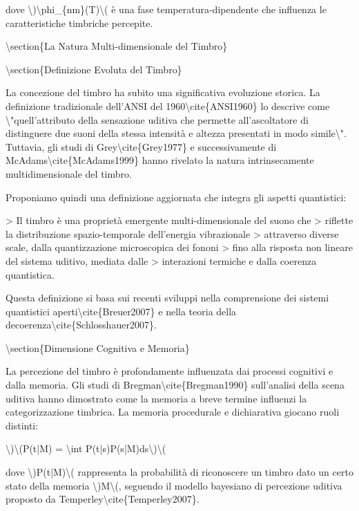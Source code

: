 \documentclass[a4paper,11pt]{article}
\begin{document}
dove \textbackslash{})\textbackslash{}phi\_\{nm\}(T)\textbackslash{}( \`e una fase temperatura-dipendente che influenza le
caratteristiche timbriche percepite.

\textbackslash{}section\{La Natura Multi-dimensionale del Timbro\}

\textbackslash{}section\{Definizione Evoluta del Timbro\}

La concezione del timbro ha subito una significativa evoluzione storica.
La definizione tradizionale dell'ANSI del 1960\textbackslash{}cite\{ANSI1960\} lo descrive
come \textbackslash{}"quell'attributo della sensazione uditiva che permette
all'ascoltatore di distinguere due suoni della stessa intensit\`a e
altezza presentati in modo simile\textbackslash{}". Tuttavia, gli studi di
Grey\textbackslash{}cite\{Grey1977\} e successivamente di McAdams\textbackslash{}cite\{McAdams1999\} hanno
rivelato la natura intrinsecamente multidimensionale del timbro.

Proponiamo quindi una definizione aggiornata che integra gli aspetti
quantistici:

> Il timbro \`e una propriet\`a emergente multi-dimensionale del suono che
> riflette la distribuzione spazio-temporale dell'energia vibrazionale
> attraverso diverse scale, dalla quantizzazione microscopica dei fononi
> fino alla risposta non lineare del sistema uditivo, mediata dalle
> interazioni termiche e dalla coerenza quantistica.

Questa definizione si basa sui recenti sviluppi nella comprensione dei
sistemi quantistici aperti\textbackslash{}cite\{Breuer2007\} e nella teoria della
decoerenza\textbackslash{}cite\{Schlosshauer2007\}.

\textbackslash{}section\{Dimensione Cognitiva e Memoria\}

La percezione del timbro \`e profondamente influenzata dai processi
cognitivi e dalla memoria. Gli studi di Bregman\textbackslash{}cite\{Bregman1990\}
sull'analisi della scena uditiva hanno dimostrato come la memoria a
breve termine influenzi la categorizzazione timbrica. La memoria
procedurale e dichiarativa giocano ruoli distinti:

\textbackslash{})\textbackslash{}(P(t|M) = \textbackslash{}int P(t|s)P(s|M)ds\textbackslash{})\textbackslash{}(

dove \textbackslash{})P(t|M)\textbackslash{}( rappresenta la probabilit\`a di riconoscere un timbro dato
un certo stato della memoria \textbackslash{})M\textbackslash{}(, seguendo il modello bayesiano di
percezione uditiva proposto da Temperley\textbackslash{}cite\{Temperley2007\}.
\end{document}
